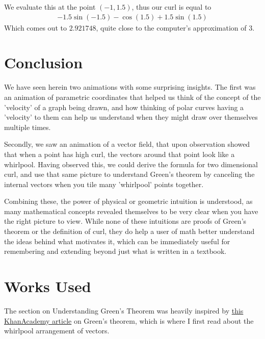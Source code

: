 \documentclass{article}
\begin{document}
    We evaluate this at the point $(-1, 1.5)$, thus our curl is equal to 
    \begin{gather*}
        -1.5\sin(-1.5) - \cos(1.5) + 1.5\sin(1.5) 
    \end{gather*}
    Which comes out to $2.921748$, quite close to the computer's approximation of $3$.

    \section{Conclusion}
    We have seen herein two animations with some surprising insights.
    The first was an animation of parametric coordinates that helped us think of the concept of the 'velocity' of a graph being drawn,
    and how thinking of polar curves having a 'velocity' to them can help us understand when they might draw over themselves multiple times.

    Secondly, we saw an animation of a vector field, that upon observation showed that when a point has high curl, the vectors around that point look like a whirlpool.
    Having observed this, we could derive the formula for two dimensional curl, and use that same picture to understand Green's theorem by canceling the internal vectors
    when you tile many 'whirlpool' points together.

    Combining these, the power of physical or geometric intuition is understood, as many mathematical concepts revealed themselves to be
    very clear when you have the right picture to view.
    While none of these intuitions are proofs of Green's theorem or the definition of curl,
    they do help a user of math better understand the ideas behind what motivates it,
    which can be immediately useful for remembering and extending beyond just what is written in a textbook.

    \section{Works Used}
    The section on Understanding Green's Theorem was heavily inspired by \href{https://www.khanacademy.org/math/multivariable-calculus/greens-theorem-and-stokes-theorem/greens-theorem-articles/a/greens-theorem}{this KhanAcademy article}
    on Green's theorem, which is where I first read about the whirlpool arrangement of vectors.
\end{document}
